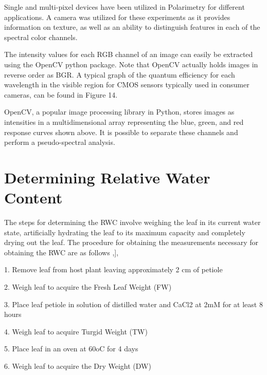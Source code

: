 Single and multi-pixel devices have been utilized in Polarimetry for different applications.  A camera was utilized for these experiments as it provides information on texture, as well as an ability to distinguish features in each of the spectral color channels.

The intensity values for each RGB channel of an image can easily be extracted using the OpenCV python package.  Note that OpenCV actually holds images in reverse order as BGR.  A typical graph of the quantum efficiency for each wavelength in the visible region for CMOS sensors typically used in consumer cameras, can be found in Figure 14.

OpenCV, a popular image processing library in Python, stores images as intensities in a multidimensional array representing the blue, green, and red response curves shown above.  It is possible to separate these channels and perform a pseudo-spectral analysis.

\section{Determining Relative Water Content}
The steps for determining the RWC involve weighing the leaf in its current water state, artificially hydrating the leaf to its maximum capacity and completely drying out the leaf.  The procedure for obtaining the measurements necessary for obtaining the RWC are as follows \cite{ecophysiology},\cite{rwc:1}],

1.	Remove leaf from host plant leaving approximately 2 cm of petiole

2.	Weigh leaf to acquire the Fresh Leaf Weight (FW)

3.	Place leaf petiole in solution of distilled water and CaCl2 at 2mM for at least 8 hours

4.	Weigh leaf to acquire Turgid Weight (TW)

5.	Place leaf in an oven at 60oC for 4 days

6.	Weigh leaf to acquire the Dry Weight (DW)



